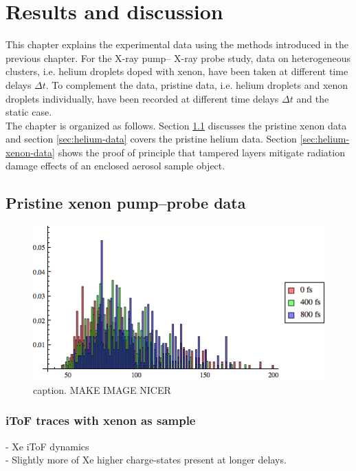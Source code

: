 \chapter{Results and discussion}\label{ch:results}
This chapter explains the experimental data using the methods introduced in the previous chapter. For the X-ray pump-- X-ray probe study, data on heterogeneous clusters, i.e. helium droplets doped with xenon, have been taken at different time delays $\Delta t$. To complement the data, pristine data, i.e. helium droplets and xenon droplets individually, have been recorded at different time delays $\Delta t$ and the static case.\\
The chapter is organized as follows. Section \ref{sec:xenon-data} discusses the pristine xenon data and section \ref{sec:helium-data} covers the pristine helium data. Section \ref{sec:helium-xenon-data} shows the proof of principle that tampered layers mitigate radiation damage effects of an enclosed aerosol sample object.
%
%
%
\section{Pristine xenon pump--probe data}\label{sec:xenon-data}
\begin{figure}
	\centering
		\includegraphics[width=1.00\textwidth]{images/size-distributions.png}
	\caption{caption. MAKE IMAGE NICER}
	\label{fig:size-distributions}
\end{figure}

%
%
%
\subsection{iToF traces with xenon as sample}
- Xe iToF dynamics\\
- Slightly more of Xe higher charge-states present at longer delays.
%
%
%
